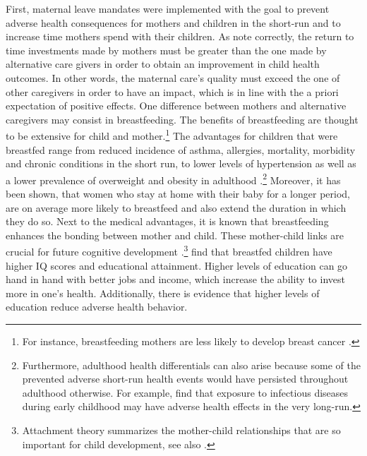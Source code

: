 \documentclass[a4paper ]{article}
\begin{document}
 First, maternal leave mandates were implemented with the goal to prevent adverse health consequences for mothers and children in the short-run and to increase time mothers spend with their children. As \cite{dustmann2012expansions} note correctly, the return to time investments made by mothers must be greater than the one made by alternative care givers in order to obtain an improvement in child health outcomes. In other words, the maternal care's quality must exceed the one of other caregivers in order to have an impact, which is in line with the a priori expectation of positive effects. \newline
One difference between mothers and alternative caregivers may consist in breastfeeding. The benefits of breastfeeding are thought to be extensive for child and mother.\footnote{For instance, breastfeeding mothers are less likely to develop breast cancer \citep{baker2008maternal}.} The advantages for children that were breastfed range from reduced incidence of asthma, allergies, mortality, morbidity and chronic conditions in the short run, to lower levels of hypertension as well as a lower prevalence of overweight and obesity in adulthood \cite{horta2007evidence}.\footnote{Furthermore, adulthood health differentials can also arise because some of the prevented adverse short-run health events would have persisted throughout adulthood otherwise. For example, \cite{case2009early} find that exposure to infectious diseases during early childhood may have adverse health effects in the very long-run.} Moreover, it has been shown, that women who stay at home with their baby for a longer period, are on average more likely to breastfeed and also extend the duration in which they do so.\newline 
Next to the medical advantages, it is known that breastfeeding enhances the bonding between mother and child. These mother-child links are crucial for future cognitive development \citep{klaus1998mother}.\footnote{Attachment theory summarizes the mother-child relationships that are so important for child development, see also \cite{belsky1991early}.} \cite{horwood1998breastfeeding} find that breastfed children have higher IQ scores and educational attainment. Higher levels of education can go hand in hand with better jobs and income, which increase the ability to invest more in one's health. Additionally, there is evidence that higher levels of education reduce adverse health behavior. \newline
\end{document}

